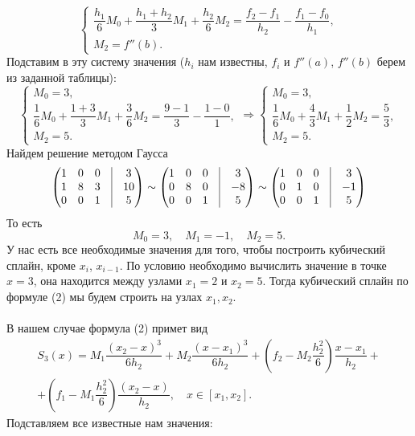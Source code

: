 \documentclass[a4paper, 12pt]{article}
\begin{document}
\begin{enumerate}
$$\begin{cases}
		\dfrac{h_1}{6}M_{0} + \dfrac{h_1 + h_{2}}{3}M_1 + \dfrac{h_{2}}{6}M_{2} = \dfrac{f_{2} - f_1}{h_{2}} - \dfrac{f_1 - f_{0}}{h_1},\\
		M_2 = f''(b).
	\end{cases}$$
	Подставим в эту систему значения ($h_i$ нам известны, $f_i$ и $f''(a)$, $f''(b)$ берем из заданной таблицы):
	$$\begin{cases}
		M_0 = 3,\\
		\dfrac{1}{6}M_{0} + \dfrac{1+3}{3}M_1 + \dfrac{3}{6}M_{2} = \dfrac{9 -1}{3} - \dfrac{1 - 0}{1},\\
		M_2=5.
	\end{cases}
	\Rightarrow 
	\begin{cases}
		M_0 = 3,\\
		\dfrac{1}{6}M_{0} + \dfrac43M_1 + \dfrac{1}{2}M_{2} = \dfrac53,\\
		M_{2}=5.
	\end{cases}$$
	Найдем решение методом Гаусса 
	$$\begin{pmatrix}
		1&0&0&\vline&3\\
		1&8&3&\vline&10\\
		0&0&1&\vline&5
	\end{pmatrix}
	\sim 
	\begin{pmatrix}
		1&0&0&\vline&3\\
		0&8&0&\vline&-8\\
		0&0&1&\vline&5
	\end{pmatrix}
	\sim
	\begin{pmatrix}
		1&0&0&\vline&3\\
		0&1&0&\vline&-1\\
		0&0&1&\vline&5
	\end{pmatrix}$$
	То есть $$M_0 = 3,\quad M_1 = -1,\quad M_2 = 5.$$
	У нас есть все необходимые значения для того, чтобы построить кубический сплайн, кроме $x_i$, $x_{i-1}$. По условию необходимо вычислить значение в точке $x=3$, она находится между узлами $x_1 = 2$ и $x_2 = 5$. Тогда кубический сплайн по формуле (2) мы будем строить на узлах $x_1, x_2$.\\\\
	В нашем случае формула (2) примет вид \begin{multline*}
		S_3(x) = M_1\dfrac{(x_2 - x)^3}{6h_2} + M_{2}\dfrac{(x-x_1)^3}{6h_2} + \left(f_2 - M_2\dfrac{h_2^2}{6}\right)\dfrac{x-x_1}{h_2} +\\+ \left(f_1 - M_1\dfrac{h_2^2}{6}\right)\dfrac{(x_2 - x)}{h_2},\quad x\in [x_1, x_2].
	\end{multline*}
	Подставляем все известные нам значения:

\end{enumerate}
\end{document}
